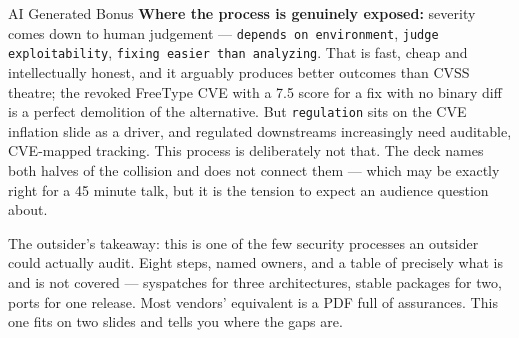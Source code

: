 \documentclass[14pt,aspectratio=169]{beamer}
\begin{document}
\begin{frame}[allowframebreaks]{AI Generated Bonus}
\textbf{Where the process is genuinely exposed:} severity comes down
to human judgement --- \texttt{depends on environment}, \texttt{judge
exploitability}, \texttt{fixing easier than analyzing}.  That is fast,
cheap and intellectually honest, and it arguably produces better
outcomes than CVSS theatre; the revoked FreeType CVE with a 7.5 score
for a fix with no binary diff is a perfect demolition of the
alternative.  But \texttt{regulation} sits on the CVE inflation slide
as a driver, and regulated downstreams increasingly need auditable,
CVE-mapped tracking.  This process is deliberately not that.  The deck
names both halves of the collision and does not connect them --- which
may be exactly right for a 45 minute talk, but it is the tension to
expect an audience question about.

\medskip
The outsider's takeaway: this is one of the few security processes an
outsider could actually audit.  Eight steps, named owners, and a table
of precisely what is and is not covered --- syspatches for three
architectures, stable packages for two, ports for one release.  Most
vendors' equivalent is a PDF full of assurances.  This one fits on two
slides and tells you where the gaps are.
\end{frame}
\end{document}
